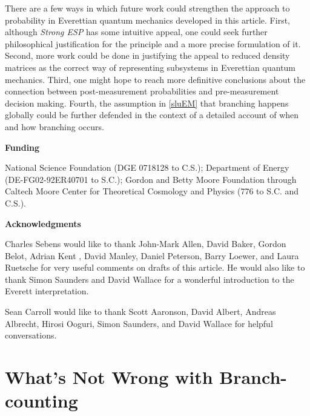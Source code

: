 \documentclass[12pt,onecolumn,secnumarabic,amsmath,amssymb,balancelastpage,nofootinbib]{article}
\begin{document}
There are a few ways in which future work could strengthen the approach to probability in Everettian quantum mechanics developed in this article.  First, although \emph{Strong ESP} has some intuitive appeal, one could seek further philosophical justification for the principle and a more precise formulation of it.  Second, more work could be done in justifying the appeal to reduced density matrices as the correct way of representing subsystems in Everettian quantum mechanics.  Third, one might hope to reach more definitive conclusions about the connection between post-measurement probabilities and pre-measurement decision making.  Fourth, the assumption in \textsection \ref{sluEM} that branching happens globally could be further defended in the context of a detailed account of when and how branching occurs.

\begin{center}
\textbf{Funding}
\end{center}

National Science Foundation (DGE 0718128 to C.S.);  Department of Energy (DE-FG02-92ER40701 to S.C.); Gordon and Betty Moore Foundation through Caltech Moore Center for Theoretical Cosmology and Physics (776 to S.C. and C.S.).

\begin{center}
\textbf{Acknowledgments}
\end{center}

Charles Sebens would like to thank John-Mark Allen, David Baker, Gordon Belot, Adrian Kent \citep[see][]{kent2014}, David Manley, Daniel Peterson, Barry Loewer, and Laura Ruetsche for very useful comments on drafts of this article.  He would also like to thank Simon Saunders and David Wallace for a wonderful introduction to the Everett interpretation.

Sean Carroll would like to thank Scott Aaronson, David Albert, Andreas Albrecht, Hirosi Ooguri, Simon Saunders, and David Wallace for helpful conversations.

\appendix

\section{What's Not Wrong with Branch-counting}\label{notaproblem}
\end{document}
